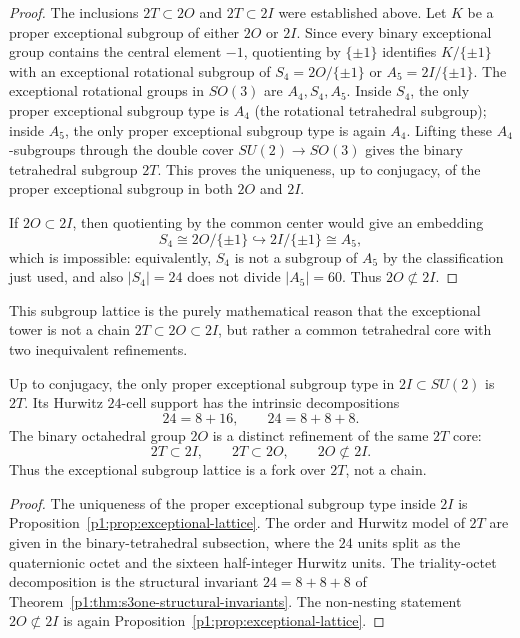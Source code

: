 \documentclass[11pt]{article}
\begin{document}
\begin{proof}
The inclusions \(2T\subset 2O\) and \(2T\subset 2I\) were established above.
Let \(K\) be a proper exceptional subgroup of either \(2O\) or \(2I\).  Since every
binary exceptional group contains the central element \(-1\), quotienting by
\(\{\pm1\}\) identifies \(K/\{\pm1\}\) with an exceptional rotational subgroup of
\(S_4=2O/\{\pm1\}\) or \(A_5=2I/\{\pm1\}\).  The exceptional rotational groups in
\(SO(3)\) are \(A_4,S_4,A_5\).  Inside \(S_4\), the only proper exceptional
subgroup type is \(A_4\) (the rotational tetrahedral subgroup); inside \(A_5\),
the only proper exceptional subgroup type is again \(A_4\).  Lifting these
\(A_4\)-subgroups through the double cover \(SU(2)\to SO(3)\) gives the binary
tetrahedral subgroup \(2T\).  This proves the uniqueness, up to conjugacy, of the
proper exceptional subgroup in both \(2O\) and \(2I\).

If \(2O\subset 2I\), then quotienting by the common center would give an embedding
\[
S_4 \cong 2O/\{\pm1\}\hookrightarrow 2I/\{\pm1\}\cong A_5,
\]
which is impossible: equivalently, \(S_4\) is not a subgroup of \(A_5\) by the
classification just used, and also \(|S_4|=24\) does not divide \(|A_5|=60\).
Thus \(2O\not\subset 2I\).
\end{proof}

\begin{remark}
This subgroup lattice is the purely mathematical reason that the exceptional tower is not a
chain \(2T\subset 2O\subset 2I\), but rather a common tetrahedral core with two inequivalent
refinements.
\end{remark}

\begin{corollary}
\label{p1:cor:exported-exceptional-carrier-skeleton}
Up to conjugacy, the only proper exceptional subgroup type in
\(2I\subset SU(2)\) is \(2T\).  Its Hurwitz \(24\)-cell support has the intrinsic
decompositions
\[
    24=8+16,
    \qquad
    24=8+8+8.
\]
The binary octahedral group \(2O\) is a distinct refinement of the same
\(2T\) core:
\[
2T\subset 2I,\qquad
2T\subset 2O,\qquad
2O\not\subset2I.
\]
Thus the exceptional subgroup lattice is a fork over \(2T\), not a chain.
\end{corollary}

\begin{proof}
The uniqueness of the proper exceptional subgroup type inside \(2I\) is
Proposition~\ref{p1:prop:exceptional-lattice}.  The order and Hurwitz model of
\(2T\) are given in the binary-tetrahedral subsection, where the \(24\) units
split as the quaternionic octet and the sixteen half-integer Hurwitz units.
The triality-octet decomposition is the structural invariant
\(24=8+8+8\) of Theorem~\ref{p1:thm:s3one-structural-invariants}.
The non-nesting statement \(2O\not\subset2I\) is again
Proposition~\ref{p1:prop:exceptional-lattice}.\qedhere
\end{proof}
\end{document}

